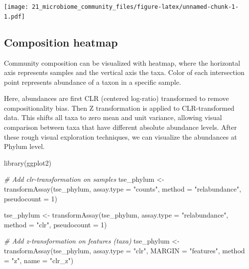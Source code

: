 \documentclass[
]{book}
\newenvironment{Shaded}{\begin{snugshade}}{\end{snugshade}}
\newcommand{\AttributeTok}[1]{\textcolor[rgb]{0.77,0.63,0.00}{#1}}
\newcommand{\CommentTok}[1]{\textcolor[rgb]{0.56,0.35,0.01}{\textit{#1}}}
\newcommand{\DecValTok}[1]{\textcolor[rgb]{0.00,0.00,0.81}{#1}}
\newcommand{\FunctionTok}[1]{\textcolor[rgb]{0.00,0.00,0.00}{#1}}
\newcommand{\NormalTok}[1]{#1}
\newcommand{\OtherTok}[1]{\textcolor[rgb]{0.56,0.35,0.01}{#1}}
\newcommand{\StringTok}[1]{\textcolor[rgb]{0.31,0.60,0.02}{#1}}
\begin{document}
\texttt{[image: 21\_microbiome\_community\_files/figure-latex/unnamed-chunk-1-1.pdf]}

\hypertarget{composition-heatmap}{%
\subsection{Composition heatmap}\label{composition-heatmap}}

Community composition can be visualized with heatmap, where the
horizontal axis represents samples and the vertical axis the
taxa. Color of each intersection point represents abundance of a taxon
in a specific sample.

Here, abundances are first CLR (centered log-ratio) transformed to
remove compositionality bias. Then Z transformation is applied to
CLR-transformed data. This shifts all taxa to zero mean and unit
variance, allowing visual comparison between taxa that have different
absolute abundance levels. After these rough visual exploration
techniques, we can visualize the abundances at Phylum level.

\begin{Shaded}
\begin{Highlighting}[]
\FunctionTok{library}\NormalTok{(ggplot2)}

\CommentTok{\# Add clr{-}transformation on samples}
\NormalTok{tse\_phylum }\OtherTok{\textless{}{-}} \FunctionTok{transformAssay}\NormalTok{(tse\_phylum, }\AttributeTok{assay.type =} \StringTok{"counts"}\NormalTok{,}
                              \AttributeTok{method =} \StringTok{"relabundance"}\NormalTok{, }\AttributeTok{pseudocount =} \DecValTok{1}\NormalTok{)}

\NormalTok{tse\_phylum }\OtherTok{\textless{}{-}} \FunctionTok{transformAssay}\NormalTok{(tse\_phylum, }\AttributeTok{assay.type =} \StringTok{"relabundance"}\NormalTok{,}
                              \AttributeTok{method =} \StringTok{"clr"}\NormalTok{, }\AttributeTok{pseudocount =} \DecValTok{1}\NormalTok{)}

\CommentTok{\# Add z{-}transformation on features (taxa)}
\NormalTok{tse\_phylum }\OtherTok{\textless{}{-}} \FunctionTok{transformAssay}\NormalTok{(tse\_phylum, }\AttributeTok{assay.type =} \StringTok{"clr"}\NormalTok{, }
                              \AttributeTok{MARGIN =} \StringTok{"features"}\NormalTok{,}
                              \AttributeTok{method =} \StringTok{"z"}\NormalTok{, }\AttributeTok{name =} \StringTok{"clr\_z"}\NormalTok{)}
\end{Highlighting}
\end{Shaded}
\end{document}
